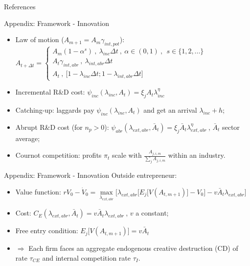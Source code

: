 \documentclass[11pt]{beamer}
\begin{document}
\begin{frame}{References}
	\nocite{*}
	
\end{frame}

\begin{frame}{Appendix: Framework - Innovation}
	\begin{itemize}\itemsep10pt	
	\item Law of motion ($A_{m+1} = A_m\gamma_{int, pot}$): $A_{t+\Delta t} =\begin{cases}
               A_m(1-\alpha^{s})\:,\: \lambda_{inc}\Delta t \:,\: \alpha \in (0,1)\:,\:\ s \in \{1, 2, ...\}\\
               A_t\gamma_{int,abr}\:,\: \lambda_{int,abr}\Delta t\\
               A_t \:, \: \big[1 - \lambda_{inc}\Delta t; 1 - \lambda_{int,abr}\Delta t\big] 
    \end{cases}$
	\item Incremental R\&D cost: $\psi_{inc}(\lambda_{inc}, A_{t}) = \xi_j A_t \lambda_{inc}^{\eta}$
	\item Catching-up: laggards pay $\psi_{inc}(\lambda_{inc}, A_{t})$ and get an arrival $\lambda_{inc} + h$;
	\item Abrupt R\&D cost (for $n_p > 0$): $\psi_{abr}(\lambda_{ext,abr}, \bar{A}_{t}) = \xi_j \bar{A}_t \lambda_{ext,abr}^{\eta}\:$, $\bar{A}_{t}$ sector average;
	\item Cournot competition: profits $\pi_t$ scale with $\frac{A_{j,i,m}}{\sum_{j}A_{j,i,m}}$ within an industry.
	\end{itemize}
\end{frame}

\begin{frame}{Appendix: Framework - Innovation}
Outside entrepreneur:
	\begin{itemize}\itemsep12pt	
	\item Value function: $rV_0 - \dot{V}_0 = \max\limits_{\lambda_{ext, abr}}\big[\lambda_{ext, abr}\big[E_j\big[V(A_{t, m+1})\big] - V_0\big] - v \bar{A}_{t}\lambda_{ext, abr}\big]$
 	\item Cost: $C_E(\lambda_{ext, abr}, \bar{A}_{t}) = v \bar{A}_{t} \lambda_{ext, abr}\:$, $v$ a constant;
	\item Free entry condition: $E_j\big[V(A_{t, m+1})\big] = v \bar{A}_{t}$
	\item $\Rightarrow$ Each firm faces an aggregate endogenous creative destruction (CD) of rate $\tau_{CE}$ and internal competition rate $\tau_I$.
	\end{itemize}
\end{frame}
\end{document}
